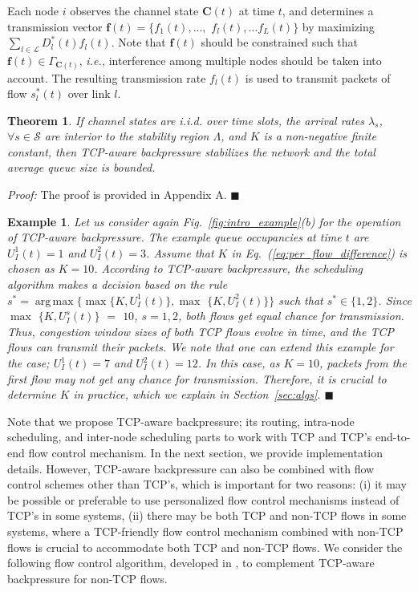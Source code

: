 \documentclass[conference]{IEEEtran}
\newcommand{\ie}{{\em i.e., }}
\newtheorem{theorem}{Theorem}
\newtheorem{example}{Example}
\newcommand{\Sset}{\mathcal{S}}
\newcommand{\Lset}{\mathcal{L}}
\DeclareMathOperator*{\argmax}{arg\,max}
\begin{document}
\begin{itemize}
  Each node $i$ observes the channel state $\boldsymbol C(t)$ at time $t$, and determines a transmission vector $\boldsymbol f(t) = \{f_1(t), ...,$ $f_l(t), ... f_L(t)\}$ by maximizing $\sum_{l \in \Lset} D_{l}^{*}(t) f_l(t)$. Note that $\boldsymbol f(t)$ should be constrained such that $\boldsymbol f(t) \in \Gamma_{\boldsymbol C(t)}$, \ie interference among multiple nodes should be taken into account. The resulting transmission rate $f_{l}(t)$ is used to transmit packets of flow $s_{l}^{*}(t)$ over link $l$.
\end{itemize}
\begin{theorem}\label{theorem1}
If channel states are i.i.d. over time slots, the arrival rates $\lambda_s$, $\forall s \in \Sset$ are interior to the stability region $\Lambda$, and $K$ is a non-negative finite constant, then TCP-aware backpressure stabilizes the network and the total average queue size is bounded.
\end{theorem}
{\em Proof:} The proof is provided in Appendix A. \hfill $\blacksquare$
\begin{example}\label{ex2}
Let us consider again Fig.~\ref{fig:intro_example}(b) for the operation of TCP-aware backpressure. The example queue occupancies at time $t$ are $U_{I}^{1}(t) = 1$ and $U_{I}^{2}(t) = 3$. Assume that $K$ in Eq.~(\ref{eq:per_flow_difference}) is chosen as $K=10$. According to TCP-aware backpressure, the scheduling algorithm makes a decision based on the rule $s^{*} = \argmax \{\max \{K,U_{I}^{1}(t)\},\max$ $\{K,U_{I}^{2}(t)\}\}$ such that $s^{*} \in \{1,2\}$. Since $\max$ $\{K,U_{I}^{s}(t)\}$ $=$ $10$, $s=1,2$, both flows get equal chance for transmission. Thus, congestion window sizes of both TCP flows evolve in time, and the TCP flows can transmit their packets. We note that one can extend this example for the case; $U_{I}^{1}(t) = 7$ and $U_{I}^{2}(t) = 12$. In this case, as $K=10$, packets from the first flow may not get any chance for transmission. Therefore, it is crucial to determine $K$ in practice, which we explain in Section~\ref{sec:algs}. \hfill $\blacksquare$
\end{example}

Note that we propose TCP-aware backpressure; its routing, intra-node scheduling, and inter-node scheduling parts to work with TCP and TCP's end-to-end flow control mechanism. In the next section, we provide implementation details. However, TCP-aware backpressure can also be combined with flow control schemes other than TCP's, which is important for two reasons: (i) it may be possible or preferable to use personalized flow control mechanisms instead of TCP's in some systems, (ii) there may be both TCP and non-TCP flows in some systems, where a TCP-friendly flow control mechanism combined with non-TCP flows is crucial to accommodate both TCP and non-TCP flows. We consider the following flow control algorithm, developed in \cite{neely_mod}, to complement TCP-aware backpressure for non-TCP flows.
\end{document}
